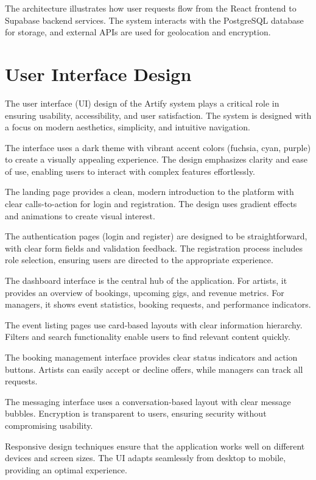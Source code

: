 \documentclass[12pt,a4paper]{report}
\begin{document}
The architecture illustrates how user requests flow from the React frontend to Supabase backend services. The system interacts with the PostgreSQL database for storage, and external APIs are used for geolocation and encryption.

\section{User Interface Design}

The user interface (UI) design of the Artify system plays a critical role in ensuring usability, accessibility, and user satisfaction. The system is designed with a focus on modern aesthetics, simplicity, and intuitive navigation.

The interface uses a dark theme with vibrant accent colors (fuchsia, cyan, purple) to create a visually appealing experience. The design emphasizes clarity and ease of use, enabling users to interact with complex features effortlessly.

The landing page provides a clean, modern introduction to the platform with clear calls-to-action for login and registration. The design uses gradient effects and animations to create visual interest.

The authentication pages (login and register) are designed to be straightforward, with clear form fields and validation feedback. The registration process includes role selection, ensuring users are directed to the appropriate experience.

The dashboard interface is the central hub of the application. For artists, it provides an overview of bookings, upcoming gigs, and revenue metrics. For managers, it shows event statistics, booking requests, and performance indicators.

The event listing pages use card-based layouts with clear information hierarchy. Filters and search functionality enable users to find relevant content quickly.

The booking management interface provides clear status indicators and action buttons. Artists can easily accept or decline offers, while managers can track all requests.

The messaging interface uses a conversation-based layout with clear message bubbles. Encryption is transparent to users, ensuring security without compromising usability.

Responsive design techniques ensure that the application works well on different devices and screen sizes. The UI adapts seamlessly from desktop to mobile, providing an optimal experience.
\end{document}
